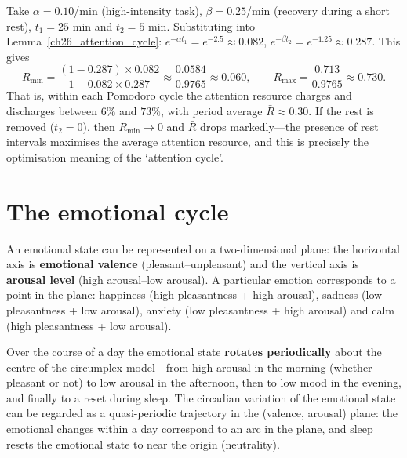 \begin{example}\label{ch26_pomodoro_example}
Take $\alpha = 0.10$/min (high-intensity task), $\beta = 0.25$/min (recovery during a short rest), $t_1 = 25$ min and $t_2 = 5$ min. Substituting into Lemma~\ref{ch26_attention_cycle}: $e^{-\alpha t_1} = e^{-2.5} \approx 0.082$, $e^{-\beta t_2} = e^{-1.25} \approx 0.287$. This gives
\[
R_{\min} = \frac{(1-0.287)\times 0.082}{1 - 0.082\times 0.287} \approx \frac{0.0584}{0.9765} \approx 0.060, \qquad
R_{\max} = \frac{0.713}{0.9765} \approx 0.730.
\]
That is, within each Pomodoro cycle the attention resource charges and discharges between $6\%$ and $73\%$, with period average $\bar R \approx 0.30$. If the rest is removed ($t_2 = 0$), then $R_{\min} \to 0$ and $\bar R$ drops markedly---the presence of rest intervals maximises the average attention resource, and this is precisely the optimisation meaning of the `attention cycle'.
\end{example}

\section{The emotional cycle}

\begin{definition}\label{def:emotion_circumplex}
An emotional state can be represented on a two-dimensional plane: the horizontal axis is \textbf{emotional valence} (pleasant--unpleasant) and the vertical axis is \textbf{arousal level} (high arousal--low arousal). A particular emotion corresponds to a point in the plane: happiness (high pleasantness + high arousal), sadness (low pleasantness + low arousal), anxiety (low pleasantness + high arousal) and calm (high pleasantness + low arousal).

Over the course of a day the emotional state \textbf{rotates periodically} about the centre of the circumplex model---from high arousal in the morning (whether pleasant or not) to low arousal in the afternoon, then to low mood in the evening, and finally to a reset during sleep. The circadian variation of the emotional state can be regarded as a quasi-periodic trajectory in the (valence, arousal) plane: the emotional changes within a day correspond to an arc in the plane, and sleep resets the emotional state to near the origin (neutrality).
\end{definition}

